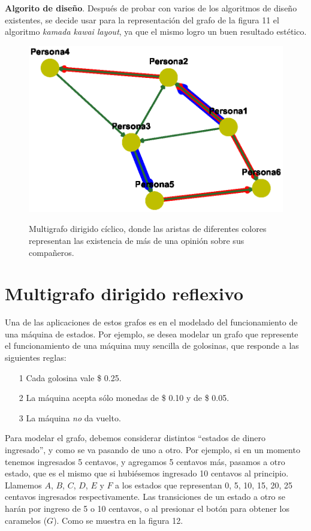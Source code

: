 \documentclass{article}
\begin{document}
\textbf{Algorito de diseño}.
Después de probar con varios de los algoritmos de diseño existentes, se decide usar para la representación del grafo de la figura 11 el algoritmo \textit{kamada kawai layout}, ya que el mismo logro un buen resultado estético.


\begin{center}

\end{center}
\begin{figure}[h]
\begin{center}
\includegraphics[scale=0.7]{Graf11_kamada_kawai_layout.eps}\\
\caption{Multigrafo dirigido cíclico, donde las aristas de diferentes colores representan las existencia de más de una opinión sobre sus compañeros.}
\end{center}
\end{figure}
\newpage
\section{Multigrafo dirigido reflexivo}
Una de las aplicaciones de estos grafos es en el modelado del funcionamiento de una máquina de estados.
Por ejemplo, se desea modelar un grafo que represente el funcionamiento de una máquina muy sencilla de golosinas, que responde a las siguientes reglas:

\begin{itemize}
\item[1] Cada golosina vale \$ 0.25.
\item[2] La máquina acepta sólo monedas de  \$ 0.10 y de \$ 0.05.
\item[3] La máquina \textit{no} da vuelto.
\end{itemize}
Para modelar el grafo, debemos considerar distintos “estados de dinero ingresado”, y como se va pasando de uno a otro. Por ejemplo, si en un momento tenemos ingresados 5 centavos, y agregamos 5 centavos más, pasamos a otro estado, que es el mismo que si hubiésemos ingresado 10 centavos al principio. Llamemos $A$, $B$, $C$, $D$, $E$ y $F$ a los estados que representan 0, 5, 10, 15, 20, 25 centavos ingresados respectivamente. Las transiciones de un estado a otro se harán por ingreso de 5 o 10 centavos, o al presionar el botón para obtener los caramelos ($G$). Como se muestra en la figura 12. 
\end{document}
